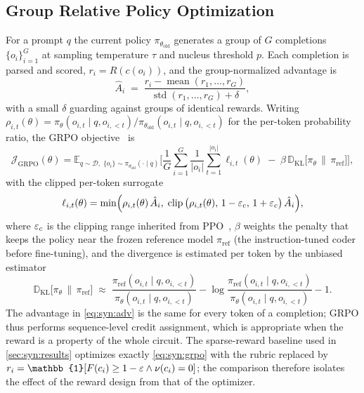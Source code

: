 \subsection{Group Relative Policy Optimization}\label{sec:syn:grpo}

For a prompt $q$ the current policy $\pi_{\theta_{\mathrm{old}}}$ generates a group of $G$ completions $\{o_i\}_{i=1}^{G}$ at sampling temperature $\tau$ and nucleus threshold $p$. Each completion is parsed and scored, $r_i=R(c(o_i))$, and the group-normalized advantage is
\begin{equation}\label{eq:syn:adv}
  \hat A_i \;=\; \frac{r_i-\operatorname{mean}(r_1,\dots,r_G)}{\operatorname{std}(r_1,\dots,r_G)+\delta},
\end{equation}
with a small $\delta$ guarding against groups of identical rewards. Writing $\rho_{i,t}(\theta)=\pi_\theta(o_{i,t}\mid q,o_{i,<t})/\pi_{\theta_{\mathrm{old}}}(o_{i,t}\mid q,o_{i,<t})$ for the per-token probability ratio, the GRPO objective~\cite{shao2024deepseekmath} is
\begin{equation}\label{eq:syn:grpo}
  \mathcal{J}_{\mathrm{GRPO}}(\theta)=
  \mathbb{E}_{q\sim\mathcal{D},\;\{o_i\}\sim\pi_{\theta_{\mathrm{old}}}(\cdot\mid q)}
  \Bigg[\frac{1}{G}\sum_{i=1}^{G}\frac{1}{|o_i|}\sum_{t=1}^{|o_i|}\ell_{i,t}(\theta)
  \;-\;\beta\, \mathbb{D}_{\mathrm{KL}}\big[\pi_\theta\,\big\|\,\pi_{\mathrm{ref}}\big]\Bigg],
\end{equation}
with the clipped per-token surrogate
\begin{equation}\label{eq:syn:clip}
  \ell_{i,t}(\theta)=\min\!\Big(\rho_{i,t}(\theta)\,\hat A_i,\;
  \operatorname{clip}\big(\rho_{i,t}(\theta),\,1-\varepsilon_{c},\,1+\varepsilon_{c}\big)\,\hat A_i\Big),
\end{equation}
where $\varepsilon_c$ is the clipping range inherited from PPO~\cite{schulman2017ppo}, $\beta$ weights the penalty that keeps the policy near the frozen reference model $\pi_{\mathrm{ref}}$ (the instruction-tuned coder before fine-tuning), and the divergence is estimated per token by the unbiased estimator
\begin{equation}\label{eq:syn:kl}
  \mathbb{D}_{\mathrm{KL}}\big[\pi_\theta\,\big\|\,\pi_{\mathrm{ref}}\big]
  \;\approx\; \frac{\pi_{\mathrm{ref}}(o_{i,t}\mid q,o_{i,<t})}{\pi_\theta(o_{i,t}\mid q,o_{i,<t})}
  -\log\frac{\pi_{\mathrm{ref}}(o_{i,t}\mid q,o_{i,<t})}{\pi_\theta(o_{i,t}\mid q,o_{i,<t})}-1 .
\end{equation}
The advantage in \cref{eq:syn:adv} is the same for every token of a completion; GRPO thus performs sequence-level credit assignment, which is appropriate when the reward is a property of the whole circuit. The sparse-reward baseline used in \cref{sec:syn:results} optimizes exactly \cref{eq:syn:grpo} with the rubric replaced by $r_i=\mathbb{1}[F(c_i)\ge 1-\eps \wedge \nu(c_i)=0]$; the comparison therefore isolates the effect of the reward design from that of the optimizer.


